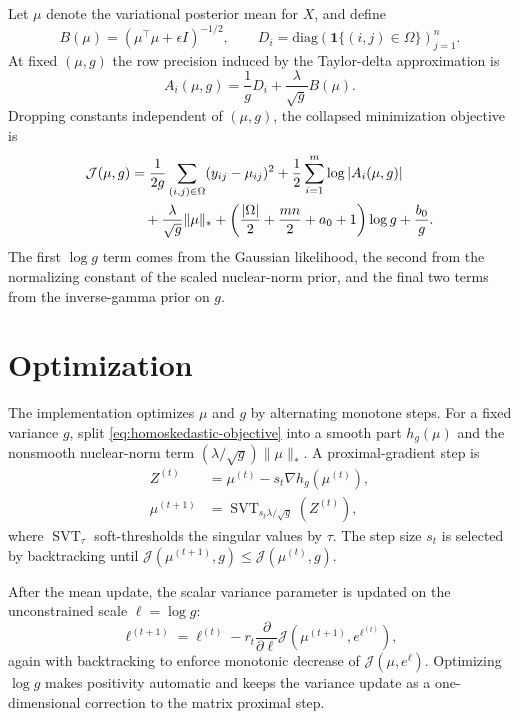 \documentclass[11pt]{article}
\begin{document}
Let $\mu$ denote the variational posterior mean for $X$, and define
\begin{equation}
    B(\mu) = \left(\mu^\top \mu + \epsilon I\right)^{-1/2},
    \qquad
    D_i = \mathrm{diag}\!\left(\mathbf{1}\{(i,j)\in\Omega\}\right)_{j=1}^n .
\end{equation}
At fixed $(\mu,g)$ the row precision induced by the Taylor-delta approximation
is
\begin{equation}
    A_i(\mu,g)
        = \frac{1}{g}D_i
        + \frac{\lambda}{\sqrt{g}}B(\mu).
\end{equation}
Dropping constants independent of $(\mu,g)$, the collapsed minimization
objective is
\begin{align}
    \mathcal{J}(\mu,g)
        &=
        \frac{1}{2g}
        \sum_{(i,j)\in\Omega}(y_{ij}-\mu_{ij})^2
        + \frac{1}{2}\sum_{i=1}^m \log |A_i(\mu,g)| \notag\\
        &\quad
        + \frac{\lambda}{\sqrt{g}}\|\mu\|_*
        + \left(\frac{|\Omega|}{2} + \frac{mn}{2} + a_0 + 1\right)\log g
        + \frac{b_0}{g}.
        \label{eq:homoskedastic-objective}
\end{align}
The first $\log g$ term comes from the Gaussian likelihood, the second from the
normalizing constant of the scaled nuclear-norm prior, and the final two terms
from the inverse-gamma prior on $g$.

\section{Optimization}

The implementation optimizes $\mu$ and $g$ by alternating monotone steps.  For a
fixed variance $g$, split \eqref{eq:homoskedastic-objective} into a smooth part
$h_g(\mu)$ and the nonsmooth nuclear-norm term
$(\lambda/\sqrt{g})\|\mu\|_*$.  A proximal-gradient step is
\begin{align}
    Z^{(t)} &= \mu^{(t)} - s_t\nabla h_g(\mu^{(t)}), \\
    \mu^{(t+1)}
        &= \operatorname{SVT}_{s_t\lambda/\sqrt{g}}\!\left(Z^{(t)}\right),
\end{align}
where $\operatorname{SVT}_\tau$ soft-thresholds the singular values by $\tau$.
The step size $s_t$ is selected by backtracking until
$\mathcal{J}(\mu^{(t+1)},g)\leq\mathcal{J}(\mu^{(t)},g)$.

After the mean update, the scalar variance parameter is updated on the
unconstrained scale $\ell=\log g$:
\begin{equation}
    \ell^{(t+1)}
        = \ell^{(t)} - r_t
        \frac{\partial}{\partial \ell}
        \mathcal{J}\!\left(\mu^{(t+1)}, e^{\ell^{(t)}}\right),
\end{equation}
again with backtracking to enforce monotonic decrease of
$\mathcal{J}(\mu,e^\ell)$.  Optimizing $\log g$ makes positivity automatic and
keeps the variance update as a one-dimensional correction to the matrix
proximal step.
\end{document}
